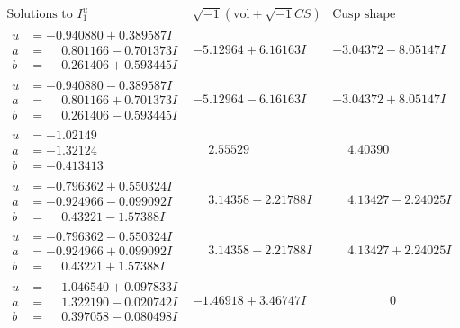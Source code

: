 \documentclass[1p]{elsarticle_modified}
\theoremstyle{definition}
\newcommand{\I}{\sqrt{-1}}
\begin{document}
$$\begin{array}{c|c|c}  
\text{Solutions to }I^u_{1}& \I (\text{vol} + \sqrt{-1}CS) & \text{Cusp shape}\\
 \hline 
\begin{aligned}
u &= -0.940880 + 0.389587 I \\
a &= \phantom{-}0.801166 - 0.701373 I \\
b &= \phantom{-}0.261406 + 0.593445 I\end{aligned}
 & -5.12964 + 6.16163 I & -3.04372 - 8.05147 I \\ \hline\begin{aligned}
u &= -0.940880 - 0.389587 I \\
a &= \phantom{-}0.801166 + 0.701373 I \\
b &= \phantom{-}0.261406 - 0.593445 I\end{aligned}
 & -5.12964 - 6.16163 I & -3.04372 + 8.05147 I \\ \hline\begin{aligned}
u &= -1.02149\phantom{ +0.000000I} \\
a &= -1.32124\phantom{ +0.000000I} \\
b &= -0.413413\phantom{ +0.000000I}\end{aligned}
 & \phantom{-}2.55529\phantom{ +0.000000I} & \phantom{-}4.40390\phantom{ +0.000000I} \\ \hline\begin{aligned}
u &= -0.796362 + 0.550324 I \\
a &= -0.924966 - 0.099092 I \\
b &= \phantom{-}0.43221 - 1.57388 I\end{aligned}
 & \phantom{-}3.14358 + 2.21788 I & \phantom{-}4.13427 - 2.24025 I \\ \hline\begin{aligned}
u &= -0.796362 - 0.550324 I \\
a &= -0.924966 + 0.099092 I \\
b &= \phantom{-}0.43221 + 1.57388 I\end{aligned}
 & \phantom{-}3.14358 - 2.21788 I & \phantom{-}4.13427 + 2.24025 I \\ \hline\begin{aligned}
u &= \phantom{-}1.046540 + 0.097833 I \\
a &= \phantom{-}1.322190 - 0.020742 I \\
b &= \phantom{-}0.397058 - 0.080498 I\end{aligned}
 & -1.46918 + 3.46747 I & \phantom{-0.000000 } 0 \\ \hline\begin{aligned}

\end{aligned}
\end{array}$$
\end{document}
